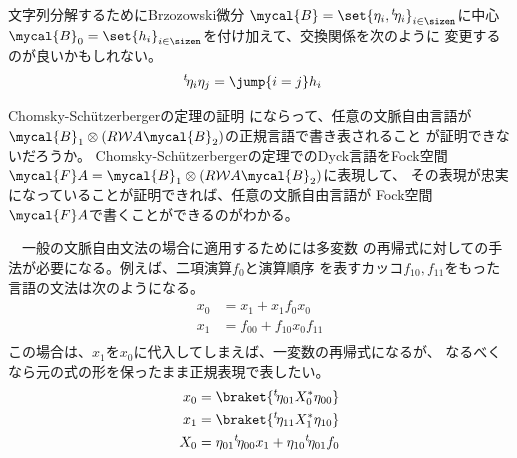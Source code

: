 	\begin{todo}[ここまで]\label{todo:ここまで} %
		\begin{description}\setlength{\itemsep}{-1mm} %
			\item[文字列分解] 文字列分解するためにBrzozowski微分
			$\mycal{B}=\set{\eta_i,\lu{t}{\eta_i}}_{i\in\sizen}$に中心
			$\mycal{B}_0=\set{h_i}_{i\in\sizen}$を付け加えて、交換関係を次のように
			変更するのが良いかもしれない。
			\begin{equation*}\begin{split} %
				\lu{t}{\eta_i}\eta_j &= \jump{i=j}h_i
			\end{split}\end{equation*} %
			\item[Chomsky-Sch{}tzerbargerの定理] 
			Chomsky-Sch{\"u}tzerbergerの定理の証明\cite{arxiv:kambites:chomsky}
			にならって、任意の文脈自由言語が
			$\mycal{B}_1\otimes(R\Word A\mycal{B}_2)$の正規言語で書き表されること
			が証明できないだろうか。
			Chomsky-Sch{\"u}tzerbergerの定理でのDyck言語をFock空間
			$\mycal{F}A=\mycal{B}_1\otimes(R\Word A\mycal{B}_2)$に表現して、
			その表現が忠実になっていることが証明できれば、任意の文脈自由言語が
			Fock空間$\mycal{F}A$で書くことができるのがわかる。
			\item[多変数の場合]　一般の文脈自由文法の場合に適用するためには多変数
			の再帰式に対しての手法が必要になる。例えば、二項演算$f_0$と演算順序
			を表すカッコ$f_{10},f_{11}$をもった言語の文法は次のようになる。
			\begin{equation*}\begin{split} %
				x_0 &= x_1 + x_1f_0 x_0 \\
				x_1 &= f_{00} + f_{10}x_0f_{11} \\
			\end{split}\end{equation*} %
			この場合は、$x_1$を$x_0$に代入してしまえば、一変数の再帰式になるが、
			なるべくなら元の式の形を保ったまま正規表現で表したい。
			\begin{equation*}\begin{split} %
				x_0 &= \braket{\lu{t}{\eta_{01}}X_0^*\eta_{00}} \\
				x_1 &= \braket{\lu{t}{\eta_{11}}X_1^*\eta_{10}} \\
				X_0 &= \eta_{01}\lu{t}{\eta_{00}}x_1
				+ \eta_{10}\lu{t}{\eta_{01}}f_0
			\end{split}\end{equation*} %
		\end{description} %
	\end{todo} %


